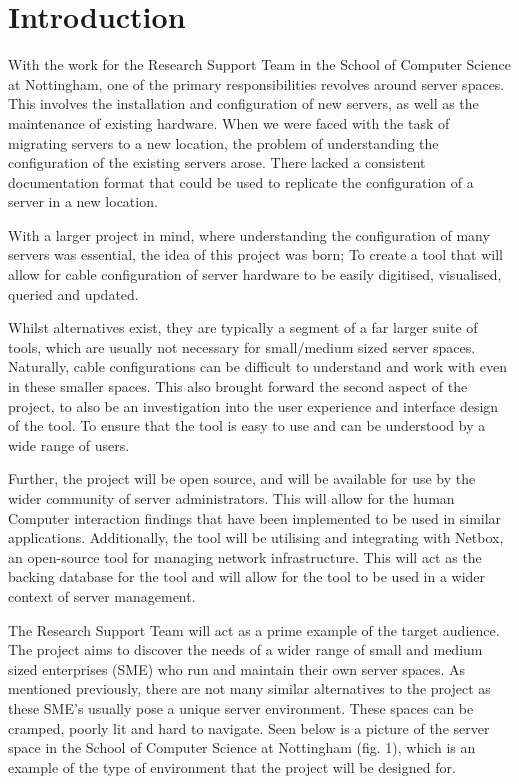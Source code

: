 \documentclass [12pt,letterpaper]{article}
\begin{document}
\setlength{\parskip}{2ex}

\section{Introduction}
\label{sec:introduction}
With the work for the Research Support Team in the School of Computer Science at Nottingham, one of the primary responsibilities revolves around server spaces. This involves the installation and configuration of new servers, as well as the maintenance of existing hardware. When we were faced with the task of migrating servers to a new location, the problem of understanding the configuration of the existing servers arose. There lacked a consistent documentation format that could be used to replicate the configuration of a server in a new location.

With a larger project in mind, where understanding the configuration of many servers was essential, the idea of this project was born; To create a tool that will allow for cable configuration of server hardware to be easily digitised, visualised, queried and updated.

Whilst alternatives exist, they are typically a segment of a far larger suite of tools, which are usually not necessary for small/medium sized server spaces. Naturally, cable configurations can be difficult to understand and work with even in these smaller spaces. This also brought forward the second aspect of the project, to also be an investigation into the user experience and interface design of the tool. To ensure that the tool is easy to use and can be understood by a wide range of users.

Further, the project will be open source, and will be available for use by the wider community of server administrators. This will allow for the human Computer interaction findings that have been implemented to be used in similar applications. Additionally, the tool will be utilising and integrating with Netbox, an open-source tool for managing network infrastructure. This will act as the backing database for the tool and will allow for the tool to be used in a wider context of server management.

The Research Support Team will act as a prime example of the target audience. The project aims to discover the needs of a wider range of small and medium sized enterprises (SME) who run and maintain their own server spaces. As mentioned previously, there are not many similar alternatives to the project as these SME's usually pose a unique server environment. These spaces can be cramped, poorly lit and hard to navigate. Seen below is a picture of the server space in the School of Computer Science at Nottingham (fig. 1), which is an example of the type of environment that the project will be designed for.
\end{document}
